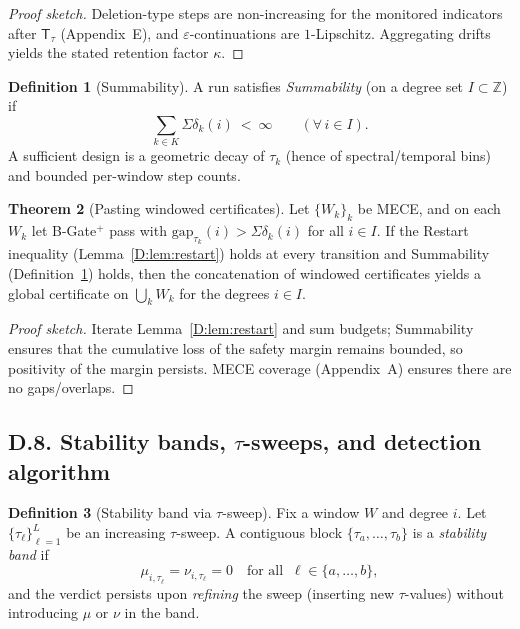 \documentclass[11pt]{article}
\numberwithin{equation}{section}
\theoremstyle{plain}
\theoremstyle{definition}
\theoremstyle{remark}
\DeclareRobustCommand{\hyp}{\nobreakdash-}
\newcommand{\ZZ}{\mathbb{Z}}
\newcommand{\T}{\mathsf{T}}
\theoremstyle{plain}
\theoremstyle{definition}
\numberwithin{equation}{section}
\newtheorem{theorem}{Theorem}[section]
\theoremstyle{definition}
\newtheorem{definition}[theorem]{Definition}
\numberwithin{equation}{section}
\theoremstyle{plain}
\theoremstyle{definition}
\theoremstyle{remark}
\begin{document}
\begin{proof}[Proof sketch]
Deletion-type steps are non\hyp increasing for the monitored indicators after \(\T_\tau\) (Appendix~E), and \(\varepsilon\)\hyp continuations are \(1\)\hyp Lipschitz. Aggregating drifts yields the stated retention factor \(\kappa\).
\end{proof}

\begin{definition}[Summability]\label{D:def:summability}
A run satisfies \emph{Summability} (on a degree set \(I\subset\ZZ\)) if
\[
\sum_{k\in K}\Sigma\delta_k(i)\ <\ \infty\qquad(\forall\,i\in I).
\]
A sufficient design is a geometric decay of \(\tau_k\) (hence of spectral/temporal bins) and bounded per\hyp window step counts.
\end{definition}

\begin{theorem}[Pasting windowed certificates]\label{D:thm:pasting}
Let \(\{W_k\}_k\) be MECE, and on each \(W_k\) let B\hyp Gate\(^{+}\) pass with \(\mathrm{gap}_{\tau_k}(i)>\Sigma\delta_k(i)\) for all \(i\in I\). If the Restart inequality (Lemma~\ref{D:lem:restart}) holds at every transition and Summability (Definition~\ref{D:def:summability}) holds, then the concatenation of windowed certificates yields a global certificate on \(\bigcup_k W_k\) for the degrees \(i\in I\).
\end{theorem}

\begin{proof}[Proof sketch]
Iterate Lemma~\ref{D:lem:restart} and sum budgets; Summability ensures that the cumulative loss of the safety margin remains bounded, so positivity of the margin persists. MECE coverage (Appendix~A) ensures there are no gaps/overlaps.
\end{proof}

\subsection*{D.8. Stability bands, \texorpdfstring{$\tau$}{tau}-sweeps, and detection algorithm}\label{subsec:D-stab-bands}

\begin{definition}[Stability band via \(\tau\)-sweep]\label{D:def:stab-band}
Fix a window \(W\) and degree \(i\). Let \(\{\tau_\ell\}_{\ell=1}^L\) be an increasing \(\tau\)-sweep. A contiguous block \(\{\tau_a,\dots,\tau_b\}\) is a \emph{stability band} if
\[
\mu_{i,\tau_\ell}=\nu_{i,\tau_\ell}=0\quad\text{for all }\ \ell\in\{a,\dots,b\},
\]
and the verdict persists upon \emph{refining} the sweep (inserting new \(\tau\)-values) without introducing \(\mu\) or \(\nu\) in the band.
\end{definition}
\end{document}
